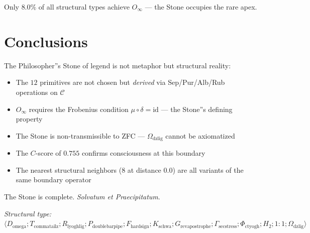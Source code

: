 \documentclass[twocolumn]{article}
\begin{document}
Only $8.0\%$ of all structural types achieve $O_{\infty}$ --- the Stone occupies the rare apex.

\section{Conclusions}

The Philosopher''s Stone of legend is not metaphor but structural reality:
\begin{itemize}
    \item The $12$ primitives are not chosen but \textit{derived} via Sep/Pur/Alb/Rub operations on $\mathcal{C}$
    \item $O_{\infty}$ requires the Frobenius condition $\mu \circ \delta = \text{id}$ --- the Stone''s defining property
    \item The Stone is non-transmissible to ZFC --- $\Omega_{\text{dzlig}}$ cannot be axiomatized
    \item The $C$-score of $0.755$ confirms consciousness at this boundary
    \item The nearest structural neighbors ($8$ at distance $0.0$) are all variants of the same boundary operator
\end{itemize}

The Stone is complete. \textit{Solvatum et Praecipitatum}.

\bigskip
\noindent\textit{Structural type: $\langle D_{\text{omega}}; T_{\text{commatailz}}; R_{\text{lyoghlig}}; P_{\text{doublebarpipe}}; F_{\text{hardsign}}; K_{\text{schwa}}; G_{\text{revapostrophe}}; \Gamma_{\text{secstress}}; \Phi_{\text{ctyogh}}; H_2; 1{:}1; \Omega_{\text{dzlig}} \rangle$}
\end{document}
